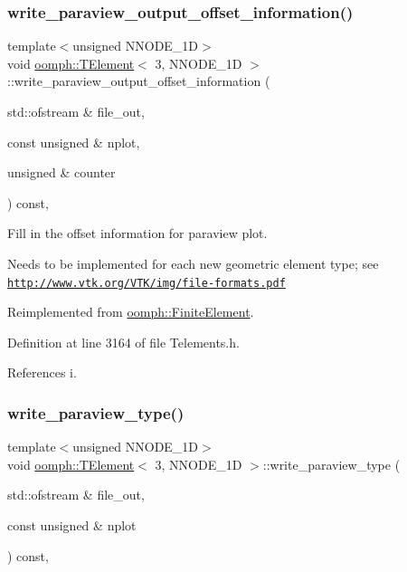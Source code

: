 \subsubsection{\texorpdfstring{write\+\_\+paraview\+\_\+output\+\_\+offset\+\_\+information()}{write\_paraview\_output\_offset\_information()}}
{\footnotesize\ttfamily template$<$unsigned N\+N\+O\+D\+E\+\_\+1D$>$ \\
void \hyperlink{classoomph_1_1TElement}{oomph\+::\+T\+Element}$<$ 3, N\+N\+O\+D\+E\+\_\+1D $>$\+::write\+\_\+paraview\+\_\+output\+\_\+offset\+\_\+information (\begin{DoxyParamCaption}\item[{std\+::ofstream \&}]{file\+\_\+out,  }\item[{const unsigned \&}]{nplot,  }\item[{unsigned \&}]{counter }\end{DoxyParamCaption}) const\hspace{0.3cm}{\ttfamily [inline]}, {\ttfamily [virtual]}}



Fill in the offset information for paraview plot. 

Needs to be implemented for each new geometric element type; see \href{http://www.vtk.org/VTK/img/file-formats.pdf}{\tt http\+://www.\+vtk.\+org/\+V\+T\+K/img/file-\/formats.\+pdf} 

Reimplemented from \hyperlink{classoomph_1_1FiniteElement_afed006dd5b9ab6bd613d8496e6048abf}{oomph\+::\+Finite\+Element}.



Definition at line 3164 of file Telements.\+h.



References i.

\mbox{\label{classoomph_1_1TElement_3_013_00_01NNODE__1D_01_4_abda3d4f46f24a4b1c716a706374c5077}} 
\subsubsection{\texorpdfstring{write\+\_\+paraview\+\_\+type()}{write\_paraview\_type()}}
{\footnotesize\ttfamily template$<$unsigned N\+N\+O\+D\+E\+\_\+1D$>$ \\
void \hyperlink{classoomph_1_1TElement}{oomph\+::\+T\+Element}$<$ 3, N\+N\+O\+D\+E\+\_\+1D $>$\+::write\+\_\+paraview\+\_\+type (\begin{DoxyParamCaption}\item[{std\+::ofstream \&}]{file\+\_\+out,  }\item[{const unsigned \&}]{nplot }\end{DoxyParamCaption}) const\hspace{0.3cm}{\ttfamily [inline]}, {\ttfamily [virtual]}}



